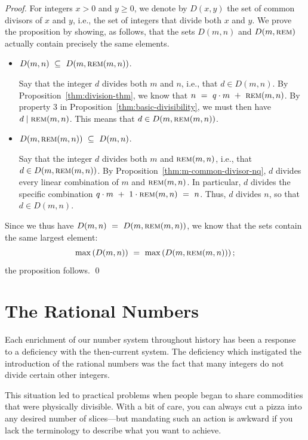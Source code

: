 \begin{proof}
For integers $x > 0$ and $y \geq 0$, we denote by $D(x,y)$ the set of common divisors of $x$ and $y$, i.e., the set of integers that divide both $x$ and $y$.  We prove the proposition by showing, as follows, that the sets $D(m, n)$ and $D(m, \mbox{\sc rem})$ actually contain precisely the same elements.
\begin{itemize}
\item 
$D(m, n) \ \subseteq \ D(m, \mbox{\sc rem}(m,n))$.

\smallskip

Say that the integer $d$ divides both $m$ and $n$, i.e., that $d \in D(m,n)$.  By Proposition~\ref{thm:division-thm}, we know that $n \ = \ q \cdot m \ + \ \mbox{\sc rem}(m,n)$.  By property 3 in Proposition~\ref{thm:basic-divisibility}, we must then have $d \mid
\mbox{\sc rem}(m,n)$.  This means that $d \in D(m, \mbox{\sc rem}(m,n))$.

\medskip\item 
$D(m, \mbox{\sc rem}(m,n)) \ \subseteq \ D(m,n)$.

\smallskip

Say that the integer $d$ divides both $m$ and $\mbox{\sc rem}(m,n)$, i.e., that $d \in D(m, \mbox{\sc rem}(m,n))$.  By Proposition~\ref{thm:m-common-divisor-nq}, $d$ divides every linear
combination of $m$ and $\mbox{\sc rem}(m,n)$.  In particular, $d$ divides the specific combination $q \cdot m \ + \ 1 \cdot \mbox{\sc rem}(m,n) \ = \ n$.  Thus, $d$ divides $n$, so that $d \in D(m,n)$.
\end{itemize}
Since we thus have $D(m, n) \ = \ D(m, \mbox{\sc rem}(m,n))$, we know that the sets contain the same largest element:
\[ \max\left( D(m, n) \right) \ = \ \max\left( D(m, \mbox{\sc rem}(m,n)) \right);
\]
the proposition follows.  \qed
\end{proof}


\section{The Rational Numbers}
\label{sec:rationals}

Each enrichment of our number system throughout history has been a response to a deficiency with the then-current system.  The deficiency which instigated the introduction of the rational numbers was the fact that many integers do not divide certain other integers.

This situation led to practical problems when people began to share commodities that were physically divisible.  With a bit of care, you can always cut a pizza into any desired number of slices---but mandating such an action is awkward if you lack the terminology to describe what you want to achieve.

